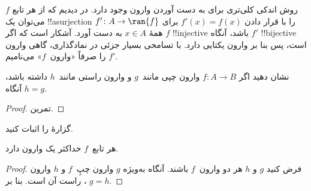 \documentclass[../../../include/open-logic-section]{subfiles}
\begin{document}
\begin{explain}
روش اندکی کلی‌تری برای به دست آوردن وارون وجود دارد. در
 دیدیم که از هر تابع $f$ می‌توان یک !!a{surjection} $f'
\colon A \to \ran{f}$ را با قرار دادن $f'(x) = f(x)$ برای همهٔ $x \in A$ به دست آورد.
آشکار است که اگر $f$ !!{injective} باشد، آنگاه $f'$ !!{bijective} است، پس
بنا بر  وارون یکتایی دارد. با تسامحی بسیار
جزئی در نمادگذاری، گاهی وارون $f'$ را صرفاً
«وارون~$f$» می‌نامیم.
\end{explain}

\begin{prop}%
  نشان دهید اگر $f\colon A \to B$ وارون چپی مانند~$g$ و وارون
  راستی مانند~$h$ داشته باشد، آنگاه $h = g$.
\end{prop}

\begin{proof}
  تمرین.
\end{proof}

\begin{prob}
  گزارهٔ  را اثبات کنید.
\end{prob}

\begin{prop}
هر تابع~$f$ حداکثر یک وارون دارد.
\end{prop}

\begin{proof}
  فرض کنید $g$ و $h$ هر دو وارون~$f$ باشند. آنگاه به‌ویژه
  $g$ وارون چپِ~$f$ و $h$ وارون راست آن است. بنا بر
  ، $g = h$.
\end{proof}
\end{document}
